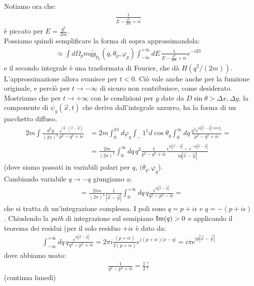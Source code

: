 \documentclass[../../FisicaTeorica.tex]{subfiles}
\begin{document}
Notiamo ora che:
\begin{align*}
\frac{1}{E-\frac{q^2}{2m}+i\epsilon}
\end{align*}
è piccato per $E=\frac{q^2}{2m}$.\\
Possiamo quindi semplificare la forma di sopra approssimandola:
\begin{align*}
\approx \int d\Omega_p m q \tilde{g}_{p_0}(q,\theta_p, \varphi_p) \int_{-\infty}^{+\infty} dE\, \frac{1}{E-\frac{q^2}{2m}+i\epsilon} e^{-iEt}
\end{align*}
e il secondo integrale è una trasformata di Fourier, che dà $H(q^2/(2m))$.\\
L'approssimazione allora svanisce per $t<0$. Ciò vale anche  anche per la funzione originale, e perciò per $t\to-\infty$ di sicuro non contribuisce, come desiderato.\\

Mostriamo che per $t\to +\infty$ con le condizioni per $g$ date da $D\sin\theta > \Delta x, \Delta y$, la componente di $\psi_y(\vec{x},t)$ che deriva dall'integrale azzurro, ha la forma di un pacchetto diffuso.
\begin{align*}
2m\int \frac{d^3 q}{(2\pi)^3} \frac{e^{i\vec{q}\cdot (\vec{x}-\vec{y})}}{p^2 - q^2 + i\epsilon} &= 2m \int_0^{2\pi} d\varphi_q \int_-1^1 d\cos\theta_q \int_0^{\infty} dq\,\frac{q^2 e^{iq|\vec{x}-\vec{y}|\cos\theta_q}}{p^2-q^2 + i\epsilon} =\\
&= \frac{2m}{(2\pi)^2} \int_0^{\infty} dq\,q^2 \frac{1}{p^2-q^2 + i\epsilon} \frac{e^{iq|\vec{x}-\vec{y}|}-e^{-iq|\vec{x}-\vec{y}|}}{iq|\vec{x}-\vec{y}|}
\end{align*}
(dove siamo passati in variabili polari per $q$, $(\theta_q, \varphi_q$).\\
Cambiando variabile $q\to -q$ giungiamo a:
\begin{align*}
&= \frac{2im}{(2\pi)^2} \frac{1}{|\vec{x}-\vec{y}|} \int_0^{+\infty} dq\, q \frac{e^{iq|\vec{x}-\vec{y}|}}{q^2 - p^2 -i\epsilon } =
\end{align*}
che si tratta di un'integrazione complessa. I poli sono $q=p + i\epsilon$ e $q=-(p+i\epsilon)$. Chiudendo la \textit{path} di integrazione sul semipiano $\operatorname{Im}(q)>0$ e applicando il teorema dei residui (per il solo residuo $+i\epsilon$ è dato da:
\begin{align*}
\int_{-\infty}^{+\infty} dq\, q \frac{e^{iq|\vec{x}-\vec{y}|}}{q^2-p^2+i\epsilon} = 2\pi i \frac{(p+i\epsilon)}{2(p+i\epsilon)} e^{i(p+i\epsilon)|x-y|} = i\pi e^{ip|\vec{x}-\vec{y}|}
\end{align*}
dove abbiamo usato:
\begin{align*}
\frac{1}{q^2 - p^2 + i\epsilon} = \frac{1}{2}\frac{?}{?}
\end{align*}
(continua lunedì)
\end{document}
